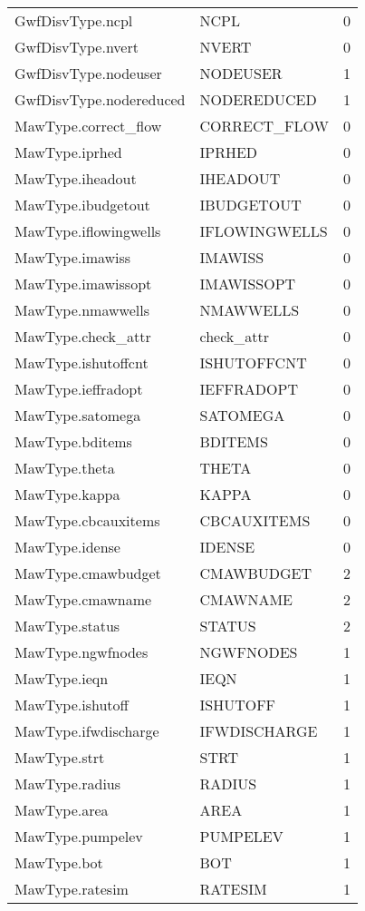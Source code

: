 \begin{longtable}{p{6cm} p{4cm} p{2cm} }
GwfDisvType.ncpl &  NCPL & 0 \\ 
GwfDisvType.nvert &  NVERT & 0 \\ 
GwfDisvType.nodeuser &  NODEUSER & 1 \\ 
GwfDisvType.nodereduced &  NODEREDUCED & 1 \\ 
MawType.correct\_flow &  CORRECT\_FLOW & 0 \\ 
MawType.iprhed &  IPRHED & 0 \\ 
MawType.iheadout &  IHEADOUT & 0 \\ 
MawType.ibudgetout &  IBUDGETOUT & 0 \\ 
MawType.iflowingwells &  IFLOWINGWELLS & 0 \\ 
MawType.imawiss &  IMAWISS & 0 \\ 
MawType.imawissopt &  IMAWISSOPT & 0 \\ 
MawType.nmawwells &  NMAWWELLS & 0 \\ 
MawType.check\_attr &  check\_attr & 0 \\ 
MawType.ishutoffcnt &  ISHUTOFFCNT & 0 \\ 
MawType.ieffradopt &  IEFFRADOPT & 0 \\ 
MawType.satomega &  SATOMEGA & 0 \\ 
MawType.bditems &  BDITEMS & 0 \\ 
MawType.theta &  THETA & 0 \\ 
MawType.kappa &  KAPPA & 0 \\ 
MawType.cbcauxitems &  CBCAUXITEMS & 0 \\ 
MawType.idense &  IDENSE & 0 \\ 
MawType.cmawbudget &  CMAWBUDGET & 2 \\ 
MawType.cmawname &  CMAWNAME & 2 \\ 
MawType.status &  STATUS & 2 \\ 
MawType.ngwfnodes &  NGWFNODES & 1 \\ 
MawType.ieqn &  IEQN & 1 \\ 
MawType.ishutoff &  ISHUTOFF & 1 \\ 
MawType.ifwdischarge &  IFWDISCHARGE & 1 \\ 
MawType.strt &  STRT & 1 \\ 
MawType.radius &  RADIUS & 1 \\ 
MawType.area &  AREA & 1 \\ 
MawType.pumpelev &  PUMPELEV & 1 \\ 
MawType.bot &  BOT & 1 \\ 
MawType.ratesim &  RATESIM & 1 \\ 

\end{longtable}
